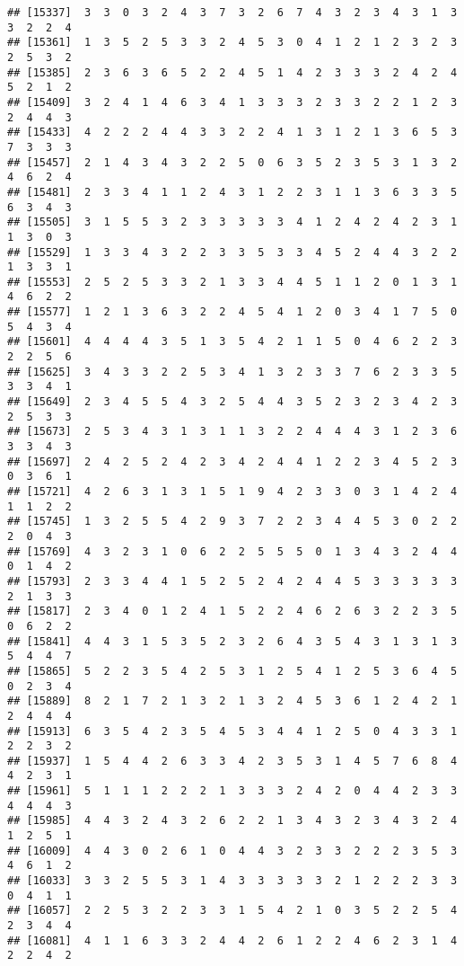 \documentclass[
]{article}
\begin{document}
\begin{verbatim}
## [15337]  3  3  0  3  2  4  3  7  3  2  6  7  4  3  2  3  4  3  1  3  3  2  2  4
## [15361]  1  3  5  2  5  3  3  2  4  5  3  0  4  1  2  1  2  3  2  3  2  5  3  2
## [15385]  2  3  6  3  6  5  2  2  4  5  1  4  2  3  3  3  2  4  2  4  5  2  1  2
## [15409]  3  2  4  1  4  6  3  4  1  3  3  3  2  3  3  2  2  1  2  3  2  4  4  3
## [15433]  4  2  2  2  4  4  3  3  2  2  4  1  3  1  2  1  3  6  5  3  7  3  3  3
## [15457]  2  1  4  3  4  3  2  2  5  0  6  3  5  2  3  5  3  1  3  2  4  6  2  4
## [15481]  2  3  3  4  1  1  2  4  3  1  2  2  3  1  1  3  6  3  3  5  6  3  4  3
## [15505]  3  1  5  5  3  2  3  3  3  3  3  4  1  2  4  2  4  2  3  1  1  3  0  3
## [15529]  1  3  3  4  3  2  2  3  3  5  3  3  4  5  2  4  4  3  2  2  1  3  3  1
## [15553]  2  5  2  5  3  3  2  1  3  3  4  4  5  1  1  2  0  1  3  1  4  6  2  2
## [15577]  1  2  1  3  6  3  2  2  4  5  4  1  2  0  3  4  1  7  5  0  5  4  3  4
## [15601]  4  4  4  4  3  5  1  3  5  4  2  1  1  5  0  4  6  2  2  3  2  2  5  6
## [15625]  3  4  3  3  2  2  5  3  4  1  3  2  3  3  7  6  2  3  3  5  3  3  4  1
## [15649]  2  3  4  5  5  4  3  2  5  4  4  3  5  2  3  2  3  4  2  3  2  5  3  3
## [15673]  2  5  3  4  3  1  3  1  1  3  2  2  4  4  4  3  1  2  3  6  3  3  4  3
## [15697]  2  4  2  5  2  4  2  3  4  2  4  4  1  2  2  3  4  5  2  3  0  3  6  1
## [15721]  4  2  6  3  1  3  1  5  1  9  4  2  3  3  0  3  1  4  2  4  1  1  2  2
## [15745]  1  3  2  5  5  4  2  9  3  7  2  2  3  4  4  5  3  0  2  2  2  0  4  3
## [15769]  4  3  2  3  1  0  6  2  2  5  5  5  0  1  3  4  3  2  4  4  0  1  4  2
## [15793]  2  3  3  4  4  1  5  2  5  2  4  2  4  4  5  3  3  3  3  3  2  1  3  3
## [15817]  2  3  4  0  1  2  4  1  5  2  2  4  6  2  6  3  2  2  3  5  0  6  2  2
## [15841]  4  4  3  1  5  3  5  2  3  2  6  4  3  5  4  3  1  3  1  3  5  4  4  7
## [15865]  5  2  2  3  5  4  2  5  3  1  2  5  4  1  2  5  3  6  4  5  0  2  3  4
## [15889]  8  2  1  7  2  1  3  2  1  3  2  4  5  3  6  1  2  4  2  1  2  4  4  4
## [15913]  6  3  5  4  2  3  5  4  5  3  4  4  1  2  5  0  4  3  3  1  2  2  3  2
## [15937]  1  5  4  4  2  6  3  3  4  2  3  5  3  1  4  5  7  6  8  4  4  2  3  1
## [15961]  5  1  1  1  2  2  2  1  3  3  3  2  4  2  0  4  4  2  3  3  4  4  4  3
## [15985]  4  4  3  2  4  3  2  6  2  2  1  3  4  3  2  3  4  3  2  4  1  2  5  1
## [16009]  4  4  3  0  2  6  1  0  4  4  3  2  3  3  2  2  2  3  5  3  4  6  1  2
## [16033]  3  3  2  5  5  3  1  4  3  3  3  3  3  2  1  2  2  2  3  3  0  4  1  1
## [16057]  2  2  5  3  2  2  3  3  1  5  4  2  1  0  3  5  2  2  5  4  2  3  4  4
## [16081]  4  1  1  6  3  3  2  4  4  2  6  1  2  2  4  6  2  3  1  4  2  2  4  2

\end{verbatim}
\end{document}
